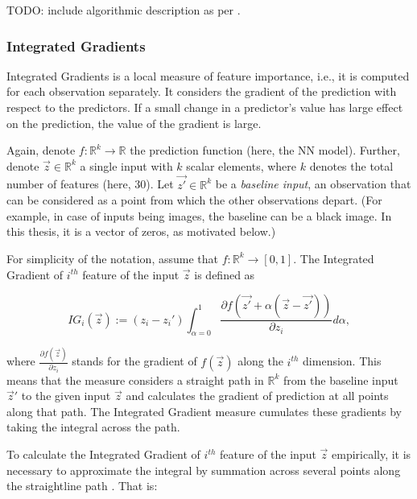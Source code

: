 			TODO: include algorithmic description as per \cite{molnar2020interpretable}.
		
			
		\subsubsection{Integrated Gradients}
			\label{chap:integrated_gradient}
			Integrated Gradients \citep{sundararajan2017axiomatic} is a local measure of feature importance, i.e., it is computed for each observation separately. It considers the gradient of the prediction with respect to the predictors. If a small change in a predictor's value has large effect on the prediction, the value of the gradient is large.
			
			Again, denote $f: \mathbb{R}^k \rightarrow \mathbb{R}$ the prediction function (here, the NN model). Further, denote $\vec{z} \in  \mathbb{R}^k$ a single input with $k$ scalar elements, where $k$ denotes the total number of features (here, 30). Let $\vec{z'} \in  \mathbb{R}^k$ be a \textit{baseline input}, an observation that can be considered as a point from which the other observations depart. (For example, in case of inputs being images, the baseline can be a black image. In this thesis, it is a vector of zeros, as motivated below.) 
			
			For simplicity of the notation, assume that $f: \mathbb{R}^k \rightarrow [0,1]$. The Integrated Gradient of $i^{th}$ feature of the input $\vec{z}$ is defined as 
			
			\begin{equation*}
				IG_i(\vec{z}) := (z_i - z_i') \int_{\alpha=0}^{1} \frac{\partial f(\vec{z'} + \alpha(\vec{z}-\vec{z'}))}{\partial z_i}d\alpha,
			\end{equation*}
			
			where $\frac{\partial f(\vec{z})}{\partial z_i}$ stands for the gradient of $f(\vec{z})$ along the $i^{th}$ dimension. This means that the measure considers a straight path in $\mathbb{R}^k$ from the baseline input ${\vec{z}'}$ to the given input ${\vec{z}}$ and calculates the gradient of prediction at all points along that path. The Integrated Gradient measure cumulates these gradients by taking the integral across the path.  
			
			To calculate the Integrated Gradient of $i^{th}$ feature of the input $\vec{z}$ empirically, it is necessary to approximate the integral by summation across several points along the straightline path  \citep{sundararajan2017axiomatic}. That is:  
			
